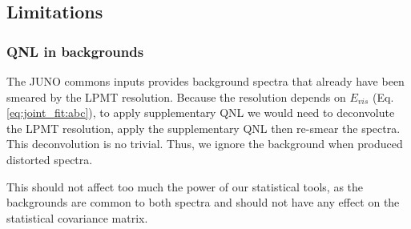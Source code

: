 \documentclass[../main.tex]{subfiles}
\begin{document}
%
%
%
%

\subsection{Limitations}
\label{sec:joint_fit:approach:lim}

\subsubsection{QNL in backgrounds}

The JUNO commons inputs provides background spectra that already have been smeared by the LPMT resolution. Because the resolution depends on $E_{vis}$ (Eq. \ref{eq:joint_fit:abc}), to apply supplementary QNL we would need to deconvolute the LPMT resolution, apply the supplementary QNL then re-smear the spectra. This deconvolution is no trivial. Thus, we ignore the background when produced distorted spectra.

This should not affect too much the power of our statistical tools, as the backgrounds are common to both spectra and should not have any effect on the statistical covariance matrix.
\end{document}
